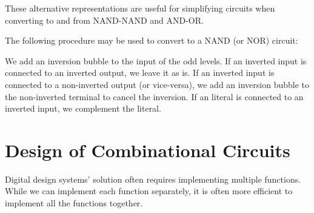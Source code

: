 \documentclass{report}
\begin{document}
These alternative representations are useful for simplifying circuits when converting to and from NAND-NAND and AND-OR.

The following procedure may be used to convert to a NAND (or NOR) circuit:

\begin{enumerate}
	\ii We add an inversion bubble to the input of the odd levels.
	\ii If an inverted input is connected to an inverted output, we leave it as is.
	\ii If an inverted input is connected to a non-inverted output (or vice-versa), we add an inversion bubble to the non-inverted terminal to cancel the inversion.
	\ii If an literal is connected to an inverted input, we complement the literal.
\end{enumerate}

\section{Design of Combinational Circuits}

Digital design systems' solution often requires implementing multiple functions. While we can implement each function separately, it is often more efficient to implement all the functions together.\\
\end{document}
